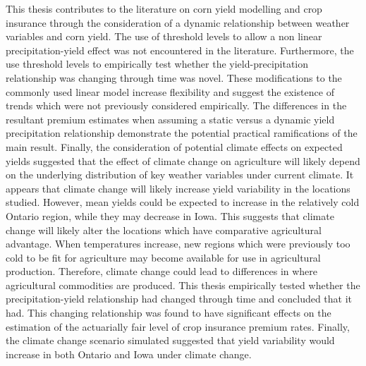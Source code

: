 This thesis contributes to the literature on corn yield modelling and crop insurance through the consideration of a dynamic relationship between weather variables and corn yield. The use of threshold levels to allow a non linear precipitation-yield effect was not encountered in the literature. Furthermore, the use threshold levels to empirically test whether the yield-precipitation relationship was changing through time was novel. These modifications to the commonly used linear model increase flexibility and suggest the existence of trends which were not previously considered empirically. The differences in the resultant premium estimates when assuming a static versus a dynamic yield precipitation relationship demonstrate the potential practical ramifications of the main result. Finally, the consideration of potential climate effects on expected yields suggested that the effect of climate change on agriculture will likely depend on the underlying distribution of key weather variables under current climate. It appears that climate change will likely increase yield variability in the locations studied. However, mean yields could be expected to increase in the relatively cold Ontario region, while they may decrease in Iowa. This suggests that climate change will likely alter the locations which have comparative agricultural advantage. When temperatures increase, new regions which were previously too cold to be fit for agriculture may become available for use in agricultural production. Therefore, climate change could lead to differences in where agricultural commodities are produced. This thesis empirically tested whether the precipitation-yield relationship had changed through time and concluded that it had. This changing relationship was found to have significant effects on the estimation of the actuarially fair level of crop insurance premium rates. Finally, the climate change scenario simulated suggested that yield variability would increase in both Ontario and Iowa under climate change.


















